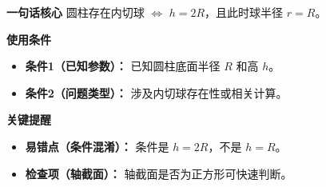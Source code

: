 \begin{summarybox}
	\textbf{\textcolor{CSummary}{一句话核心}}
	圆柱存在内切球 $\iff$ $h=2R$，且此时球半径 $r=R$。

	\medskip
	\textbf{\textcolor{CSummary}{使用条件}}
	\begin{itemize}[leftmargin=*, itemsep=0.5em, topsep=0.4em]
		\item \textbf{条件1（已知参数）：} 已知圆柱底面半径 $R$ 和高 $h$。
		\item \textbf{条件2（问题类型）：} 涉及内切球存在性或相关计算。
	\end{itemize}

	\medskip
	\textbf{\textcolor{CSummary}{关键提醒}}
	\begin{itemize}[leftmargin=*, itemsep=0.5em, topsep=0.4em]
		\item \textbf{易错点（条件混淆）：} 条件是 $h=2R$，不是 $h=R$。
		\item \textbf{检查项（轴截面）：} 轴截面是否为正方形可快速判断。
	\end{itemize}

\end{summarybox}
